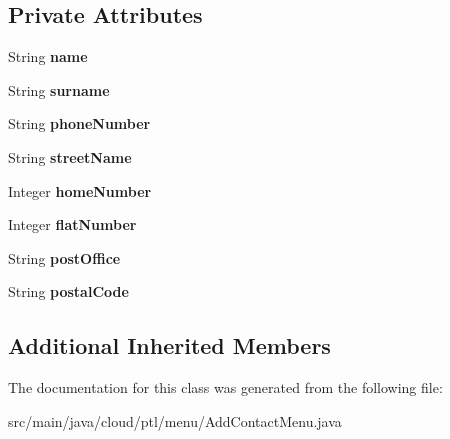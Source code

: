 \subsection*{Private Attributes}
\begin{DoxyCompactItemize}
\item 
\mbox{\label{classcloud_1_1ptl_1_1menu_1_1AddContactMenu_a4100893769d7b252bd944354a83108fa}} 
String {\bfseries name}
\item 
\mbox{\label{classcloud_1_1ptl_1_1menu_1_1AddContactMenu_ad6e860278ebf81977ccf91e3f47e5f7e}} 
String {\bfseries surname}
\item 
\mbox{\label{classcloud_1_1ptl_1_1menu_1_1AddContactMenu_a66730bc98b7350577f1f4078fb3936f2}} 
String {\bfseries phone\+Number}
\item 
\mbox{\label{classcloud_1_1ptl_1_1menu_1_1AddContactMenu_a23a1c4f99d2e59b068c67403b23072bc}} 
String {\bfseries street\+Name}
\item 
\mbox{\label{classcloud_1_1ptl_1_1menu_1_1AddContactMenu_af3a2d2e905dbbdaae261c5c62dd188ec}} 
Integer {\bfseries home\+Number}
\item 
\mbox{\label{classcloud_1_1ptl_1_1menu_1_1AddContactMenu_a9cda1b0ee5818217482df7bc5bb2bff9}} 
Integer {\bfseries flat\+Number}
\item 
\mbox{\label{classcloud_1_1ptl_1_1menu_1_1AddContactMenu_aa8aed7909abeaa3b52ae565e7c84404f}} 
String {\bfseries post\+Office}
\item 
\mbox{\label{classcloud_1_1ptl_1_1menu_1_1AddContactMenu_a62f5dd68381973485600264d5c0061cf}} 
String {\bfseries postal\+Code}
\end{DoxyCompactItemize}
\subsection*{Additional Inherited Members}


The documentation for this class was generated from the following file\+:\begin{DoxyCompactItemize}
\item 
src/main/java/cloud/ptl/menu/Add\+Contact\+Menu.\+java\end{DoxyCompactItemize}
